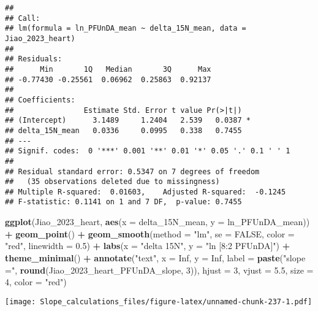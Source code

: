 \documentclass[
]{article}
\newenvironment{Shaded}{\begin{snugshade}}{\end{snugshade}}
\newcommand{\AttributeTok}[1]{\textcolor[rgb]{0.13,0.29,0.53}{#1}}
\newcommand{\ConstantTok}[1]{\textcolor[rgb]{0.56,0.35,0.01}{#1}}
\newcommand{\DecValTok}[1]{\textcolor[rgb]{0.00,0.00,0.81}{#1}}
\newcommand{\FloatTok}[1]{\textcolor[rgb]{0.00,0.00,0.81}{#1}}
\newcommand{\FunctionTok}[1]{\textcolor[rgb]{0.13,0.29,0.53}{\textbf{#1}}}
\newcommand{\NormalTok}[1]{#1}
\newcommand{\SpecialCharTok}[1]{\textcolor[rgb]{0.81,0.36,0.00}{\textbf{#1}}}
\newcommand{\StringTok}[1]{\textcolor[rgb]{0.31,0.60,0.02}{#1}}
\begin{document}
\begin{verbatim}
## 
## Call:
## lm(formula = ln_PFUnDA_mean ~ delta_15N_mean, data = Jiao_2023_heart)
## 
## Residuals:
##      Min       1Q   Median       3Q      Max 
## -0.77430 -0.25561  0.06962  0.25863  0.92137 
## 
## Coefficients:
##                Estimate Std. Error t value Pr(>|t|)  
## (Intercept)      3.1489     1.2404   2.539   0.0387 *
## delta_15N_mean   0.0336     0.0995   0.338   0.7455  
## ---
## Signif. codes:  0 '***' 0.001 '**' 0.01 '*' 0.05 '.' 0.1 ' ' 1
## 
## Residual standard error: 0.5347 on 7 degrees of freedom
##   (35 observations deleted due to missingness)
## Multiple R-squared:  0.01603,    Adjusted R-squared:  -0.1245 
## F-statistic: 0.1141 on 1 and 7 DF,  p-value: 0.7455
\end{verbatim}

\begin{Shaded}
\begin{Highlighting}[]
\FunctionTok{ggplot}\NormalTok{(Jiao\_2023\_heart, }\FunctionTok{aes}\NormalTok{(}\AttributeTok{x =}\NormalTok{ delta\_15N\_mean, }\AttributeTok{y =}\NormalTok{ ln\_PFUnDA\_mean)) }\SpecialCharTok{+}
  \FunctionTok{geom\_point}\NormalTok{() }\SpecialCharTok{+}
  \FunctionTok{geom\_smooth}\NormalTok{(}\AttributeTok{method =} \StringTok{"lm"}\NormalTok{, }\AttributeTok{se =} \ConstantTok{FALSE}\NormalTok{, }\AttributeTok{color =} \StringTok{"red"}\NormalTok{, }\AttributeTok{linewidth =} \FloatTok{0.5}\NormalTok{) }\SpecialCharTok{+}
  \FunctionTok{labs}\NormalTok{(}\AttributeTok{x =} \StringTok{"delta 15N"}\NormalTok{,}
       \AttributeTok{y =} \StringTok{"ln [8:2 PFUnDA]"}\NormalTok{) }\SpecialCharTok{+}
  \FunctionTok{theme\_minimal}\NormalTok{() }\SpecialCharTok{+}
  \FunctionTok{annotate}\NormalTok{(}\StringTok{"text"}\NormalTok{, }\AttributeTok{x =} \ConstantTok{Inf}\NormalTok{, }\AttributeTok{y =} \ConstantTok{Inf}\NormalTok{, }\AttributeTok{label =} \FunctionTok{paste}\NormalTok{(}\StringTok{"slope ="}\NormalTok{, }\FunctionTok{round}\NormalTok{(Jiao\_2023\_heart\_PFUnDA\_slope, }\DecValTok{3}\NormalTok{)), }
           \AttributeTok{hjust =} \DecValTok{3}\NormalTok{, }\AttributeTok{vjust =} \FloatTok{5.5}\NormalTok{, }\AttributeTok{size =} \DecValTok{4}\NormalTok{, }\AttributeTok{color =} \StringTok{"red"}\NormalTok{)}
\end{Highlighting}
\end{Shaded}

\texttt{[image: Slope\_calculations\_files/figure-latex/unnamed-chunk-237-1.pdf]}
\end{document}
